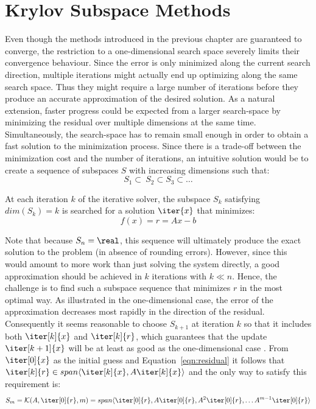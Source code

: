 \section{Krylov Subspace Methods}
\label{sec:krylov_methods}

Even though the methods introduced in the previous chapter are guaranteed to converge, the restriction to a one-dimensional search space severely limits their convergence behaviour. Since the error is only minimized along the current search direction, multiple iterations might actually end up optimizing along the same search space. Thus they might require a large number of iterations before they produce an accurate approximation of the desired solution. As a natural extension, faster progress could be expected from a larger search-space by minimizing the residual over multiple dimensions at the same time. Simultaneously, the search-space has to remain small enough in order to obtain a fast solution to the minimization process. Since there is a trade-off between the minimization cost and the number of iterations, an intuitive solution would be to create a sequence of subspaces $S$ with increasing dimensions such that:
\begin{equation}
    S_1 \subset \ S_2 \subset S_3 \subset \dots
\end{equation}

\noindent At each iteration $k$ of the iterative solver, the subspace $S_k$ satisfying $dim(S_k)=k$ is searched for a solution $\iter{x}$ that minimizes:
\begin{equation}
\label{eqn:residual}
    f(x)= r = Ax-b
\end{equation}

\noindent Note that because $S_n=\real$, this sequence will ultimately produce the exact solution to the problem (in absence of rounding errors). However, since this would amount to more work than just solving the system directly, a good approximation should be achieved in $k$ iterations with $k \ll n$. Hence, the challenge is to find such a subspace sequence that minimizes $r$ in the most optimal way. As illustrated in the one-dimensional case, the error of the approximation decreases most rapidly in the direction of the residual. Consequently it seems reasonable to choose $S_{k+1}$ at iteration $k$ so that it includes both $\iter[k]{x}$ and $\iter[k]{r}$, which guarantees that the update $\iter[k+1]{x}$ will be at least as good as the one-dimensional case \cite{golub_matrix_2013}. From $\iter[0]{x}$ as the initial guess and Equation~\hyperref[eqn:residual]{\ref{eqn:residual}} it follows that $\iter[k]{r} \in span\langle\iter[k]{x},A\iter[k]{x}\rangle$ and the only way to satisfy this requirement is:
\begin{equation}
    S_m=\mathcal{K}(A,\iter[0]{r}, m) = span\langle\iter[0]{r}, A\iter[0]{r}, A^2\iter[0]{r},\dots A^{m-1}\iter[0]{r}\rangle
\end{equation}

